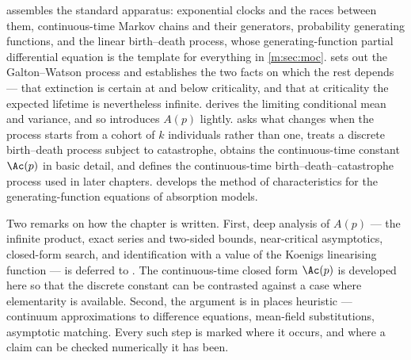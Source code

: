  assembles the standard apparatus: exponential clocks and the
races between them, continuous-time Markov chains and their generators,
probability generating functions, and the linear birth--death process, whose
generating-function partial differential equation is the template for everything in
\cref{m:sec:moc}.  sets out the Galton--Watson process and establishes
the two facts on which the rest depends --- that extinction is certain at and below
criticality, and that at criticality the expected lifetime is nevertheless infinite.
 derives the limiting conditional mean and variance, and so
introduces $A(p)$ lightly.  asks what changes when the process
starts from a cohort of $k$ individuals rather than one, treats a discrete
birth--death process subject to catastrophe, obtains the continuous-time constant
$\Ac(p)$ in basic detail, and defines the continuous-time birth--death--catastrophe
process used in later chapters.  develops the method of
characteristics for the generating-function equations of absorption models.

Two remarks on how the chapter is written. First, deep analysis of $A(p)$ --- the
infinite product, exact series and two-sided bounds, near-critical asymptotics,
closed-form search, and identification with a value of the Koenigs linearising
function --- is deferred to \ChA. The continuous-time closed form $\Ac(p)$ is
developed here so that the discrete constant can be contrasted against a case where
elementarity is available. Second, the argument is in places heuristic --- continuum
approximations to difference equations, mean-field substitutions, asymptotic
matching. Every such step is marked where it occurs, and where a claim can be
checked numerically it has been.
